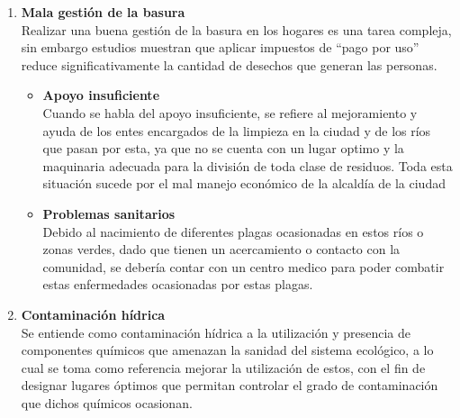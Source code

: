 \begin{enumerate}
\begin{itemize}
	      \end{itemize}
	\item \textbf{Mala gestión de la basura}\\
	      Realizar una buena gestión de la basura en los hogares es una tarea compleja, sin embargo estudios muestran que aplicar impuestos de ``pago por uso'' reduce significativamente la cantidad de desechos que generan las personas.
	      \begin{itemize}
		      \item  \textbf{Apoyo insuficiente}\\
		            Cuando se habla del apoyo insuficiente, se refiere al mejoramiento y ayuda de los entes encargados de la limpieza en la ciudad y de los ríos que pasan por esta, ya que no se cuenta con un lugar optimo y la maquinaria adecuada para la división de toda clase de residuos. Toda esta situación sucede por el mal manejo económico de la alcaldía de la ciudad

		      \item \textbf{Problemas sanitarios}\\
		            Debido al nacimiento de diferentes plagas ocasionadas en estos ríos o zonas verdes, dado que tienen un acercamiento o contacto con la comunidad, se debería contar con un centro medico para poder combatir estas enfermedades ocasionadas por estas plagas.
	      \end{itemize}
	\item \textbf{Contaminación hídrica} \\
	      Se entiende como contaminación hídrica a la utilización y presencia de componentes químicos que amenazan la sanidad del sistema ecológico, a lo cual se toma como referencia mejorar la utilización de estos, con el fin de designar lugares óptimos que permitan controlar el grado de contaminación que dichos químicos ocasionan.
\end{enumerate}
